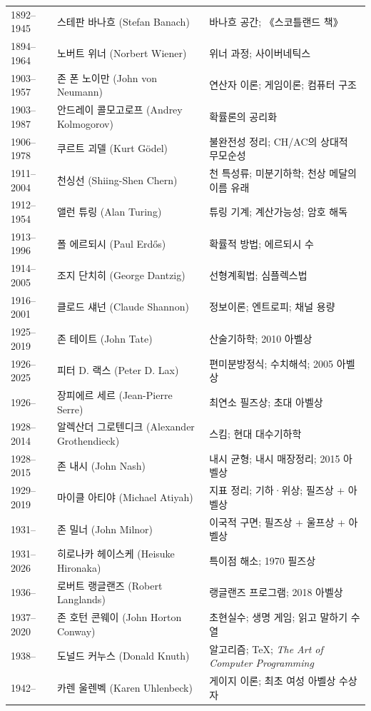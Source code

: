 \begin{center}
\begin{longtable}{@{}L{0.16\textwidth}L{0.24\textwidth}L{0.52\textwidth}@{}}
1892--1945 & 스테판 바나흐 (Stefan Banach) & 바나흐 공간; 《스코틀랜드 책》\\
1894--1964 & 노버트 위너 (Norbert Wiener) & 위너 과정; 사이버네틱스\\
1903--1957 & 존 폰 노이만 (John von Neumann) & 연산자 이론; 게임이론; 컴퓨터 구조\\
1903--1987 & 안드레이 콜모고로프 (Andrey Kolmogorov) & 확률론의 공리화\\
1906--1978 & 쿠르트 괴델 (Kurt Gödel) & 불완전성 정리; CH/AC의 상대적 무모순성\\
1911--2004 & 천싱선 (Shiing-Shen Chern) & 천 특성류; 미분기하학; 천상 메달의 이름 유래\\
1912--1954 & 앨런 튜링 (Alan Turing) & 튜링 기계; 계산가능성; 암호 해독\\
1913--1996 & 폴 에르되시 (Paul Erdős) & 확률적 방법; 에르되시 수\\
1914--2005 & 조지 단치히 (George Dantzig) & 선형계획법; 심플렉스법\\
1916--2001 & 클로드 섀넌 (Claude Shannon) & 정보이론; 엔트로피; 채널 용량\\
1925--2019 & 존 테이트 (John Tate) & 산술기하학; 2010 아벨상\\
1926--2025 & 피터 D. 랙스 (Peter D. Lax) & 편미분방정식; 수치해석; 2005 아벨상\\
1926-- & 장피에르 세르 (Jean-Pierre Serre) & 최연소 필즈상; 초대 아벨상\\
1928--2014 & 알렉산더 그로텐디크 (Alexander Grothendieck) & 스킴; 현대 대수기하학\\
1928--2015 & 존 내시 (John Nash) & 내시 균형; 내시 매장정리; 2015 아벨상\\
1929--2019 & 마이클 아티야 (Michael Atiyah) & 지표 정리; 기하·위상; 필즈상 + 아벨상\\
1931-- & 존 밀너 (John Milnor) & 이국적 구면; 필즈상 + 울프상 + 아벨상\\
1931--2026 & 히로나카 헤이스케 (Heisuke Hironaka) & 특이점 해소; 1970 필즈상\\
1936-- & 로버트 랭글랜즈 (Robert Langlands) & 랭글랜즈 프로그램; 2018 아벨상\\
1937--2020 & 존 호턴 콘웨이 (John Horton Conway) & 초현실수; 생명 게임; 읽고 말하기 수열\\
1938-- & 도널드 커누스 (Donald Knuth) & 알고리즘; \TeX; \textit{The Art of Computer Programming}\\
1942-- & 카렌 울렌벡 (Karen Uhlenbeck) & 게이지 이론; 최초 여성 아벨상 수상자\\

\end{longtable}
\end{center}
